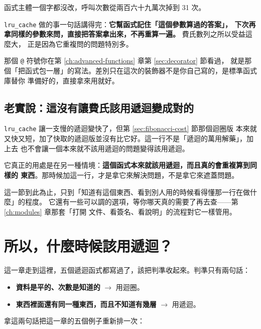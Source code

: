 
函式主體一個字都沒改，呼叫次數從兩百六十九萬次掉到 31 次。

\texttt{lru\_cache} 做的事一句話講得完：\textbf{它幫函式記住「這個參數算過的答案」，
下次再拿同樣的參數來問，直接把答案拿出來，不再重算一遍。} 費氏數列之所以受益這麼大，
正是因為它重複問的問題特別多。

那個 \texttt{@} 符號你在第 \ref{ch:advanced-functions} 章第 \ref{sec:decorator} 節看過，
就是那個「把函式包一層」的寫法。差別只在這次的裝飾器不是你自己寫的，是標準函式庫替你
準備好的，直接拿來用就好。

\subsection*{老實說：這沒有讓費氏該用遞迴變成對的}

\texttt{lru\_cache} 讓一支慢的遞迴變快了，但第 \ref{sec:fibonacci-cost} 節那個迴圈版
本來就又快又短，加了快取的遞迴版並沒有比它好。這一行不是「遞迴的萬用解藥」，加上去
也不會讓一個本來就不該用遞迴的問題變得該用遞迴。

它真正的用處是在另一種情境：\textbf{這個函式本來就該用遞迴，而且真的會重複算到同樣的
東西}。那時候加這一行，才是拿它來解決問題，不是拿它來遮蓋問題。

這一節到此為止，只到「知道有這個東西、看到別人用的時候看得懂那一行在做什麼」的程度。
它還有一些可以調的選項，等你哪天真的需要了再去查——第 \ref{ch:modules} 章那套「打開
文件、看簽名、看說明」的流程對它一樣管用。

\section{所以，什麼時候該用遞迴？}
\label{sec:recursion-or-loop}

這一章走到這裡，五個遞迴函式都寫過了，該把判準收起來。判準只有兩句話：

\begin{itemize}
\item \textbf{資料是平的、次數是知道的} $\to$ 用迴圈。
\item \textbf{東西裡面還有同一種東西，而且不知道有幾層} $\to$ 用遞迴。
\end{itemize}

拿這兩句話把這一章的五個例子重新排一次：

